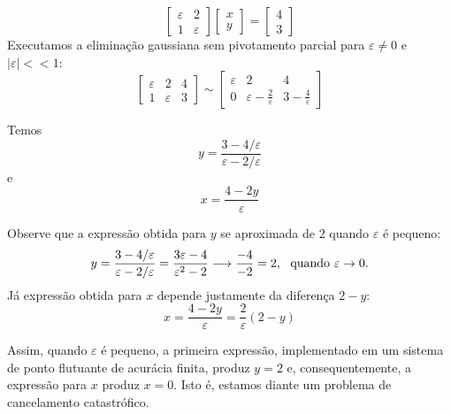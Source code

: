 \begin{ex}
$$\left[\begin{array}{cc}
\varepsilon & 2\\
1 & \varepsilon
\end{array}\right]
\left[\begin{array}{c}x\\y
\end{array}\right]=
\left[\begin{array}{c}4\\3
\end{array}\right]
$$
Executamos a eliminação gaussiana sem pivotamento parcial para $\varepsilon \neq 0$ e $|\varepsilon|<<1$:
$$\left[\begin{array}{cc|c}
\varepsilon & 2 & 4\\
1 & \varepsilon & 3
\end{array}
\right]\sim\left[\begin{array}{cc|c}
\varepsilon & 2 & 4\\
0 & \varepsilon-\frac{2}{\varepsilon} & 3-\frac{4}{\varepsilon}
\end{array}
\right]
$$

Temos
$$y=\frac{3-4/\varepsilon}{\varepsilon-2/\varepsilon}$$%
e
$$x=\frac{4-2y}{\varepsilon}$$ %

Observe que a expressão obtida para  $y$ se aproximada de $2$ quando $\varepsilon$ é pequeno:
$$y=\frac{3-4/\varepsilon}{\varepsilon-2/\varepsilon}=\frac{3\varepsilon-4}{\varepsilon^2-2} \longrightarrow \frac{-4}{-2}=2, ~~\hbox{quando}~\varepsilon \to 0.$$
Já expressão obtida para $x$ depende justamente da diferença $2-y$:
$$x=\frac{4-2y}{\varepsilon}=\frac{2}{\varepsilon} (2-y)$$

Assim, quando $\varepsilon$ é pequeno, a primeira expressão, implementado em um sistema de ponto flutuante de acurácia finita, produz $y= 2$ e, consequentemente, a expressão para $x$ produz $x=0$. Isto é, estamos diante um problema de cancelamento catastrófico.


\end{ex}
